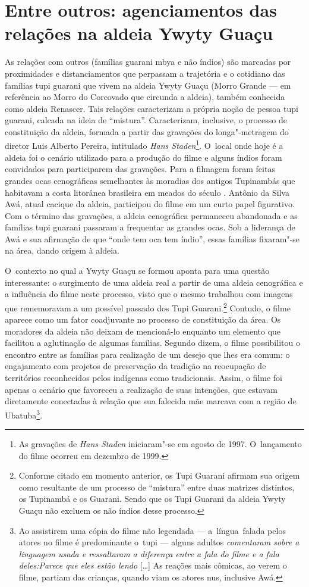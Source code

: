 \section{Entre outros: agenciamentos das relações na aldeia Ywyty Guaçu} 

As relações com outros (famílias guarani mbya e não índios) são marcadas
por proximidades e distanciamentos que perpassam a trajetória e o
cotidiano das famílias tupi guarani que vivem na aldeia Ywyty Guaçu
(Morro Grande --- em referência ao Morro do Corcovado que circunda a
aldeia), também conhecida como aldeia Renascer. Tais relações
caracterizam a própria noção de pessoa tupi guarani, calcada na ideia
de ``mistura''. Caracterizam, inclusive, o processo de constituição da
aldeia, formada a partir das gravações do longa"-metragem do diretor
Luis Alberto Pereira, intitulado \emph{Hans Staden}\footnote{As gravações de
\emph{Hans Staden} iniciaram"-se em agosto de 1997. O~lançamento do filme
ocorreu em dezembro de 1999.}. O~local onde hoje é a aldeia foi o
cenário utilizado para a produção do filme e alguns índios foram
convidados para participarem das gravações. Para a filmagem foram
feitas grandes ocas cenográficas semelhantes às moradias dos antigos
Tupinambás que habitavam a costa litorânea brasileira em meados do
século . Antônio da Silva Awá, atual cacique da aldeia, participou
do filme em um curto papel figurativo. Com o término das gravações, a
aldeia cenográfica permaneceu abandonada e as famílias tupi guarani
passaram a frequentar as grandes ocas. Sob a liderança de Awá e sua
afirmação de que ``onde tem oca tem índio'', essas famílias fixaram"-se na
área, dando origem à aldeia.

O~contexto no qual a Ywyty Guaçu se formou aponta para uma questão
interessante: o surgimento de uma aldeia real a partir de uma aldeia
cenográfica e a influência do filme neste processo, visto que o mesmo
trabalhou com imagens que rememoravam a um possível passado dos Tupi
Guarani.\footnote{Conforme citado em momento anterior, os Tupi Guarani
afirmam sua origem como resultante de um processo de ``mistura'' entre duas
matrizes distintos, os Tupinambá e os Guarani. Sendo que os Tupi
Guarani da aldeia Ywyty Guaçu não excluem os não índios desse
processo.} Contudo, o filme aparece como um fator coadjuvante no
processo de constituição da área. Os moradores da aldeia não deixam de
mencioná-lo enquanto um elemento que facilitou a aglutinação de algumas
famílias. Segundo dizem, o filme possibilitou o encontro entre as
famílias para realização de um desejo que lhes era comum: o engajamento
com projetos de preservação da tradição na reocupação de territórios
reconhecidos pelos indígenas como tradicionais. Assim, o filme foi
apenas o cenário que favoreceu a realização de suas intenções, que
estavam diretamente conectadas à relação que sua falecida mãe marcava
com a região de Ubatuba\footnote{Ao assistirem uma cópia do filme não
legendada --- a~língua~falada pelos atores no filme é predominante o~tupi
--- alguns adultos \emph{comentaram sobre a linguagem usada e ressaltaram
a diferença entre a fala do filme e a fala deles:}\emph{Parece que
eles estão lendo} [\ldots{}] As reações mais cômicas, ao verem o filme, partiam
das crianças, quando viam os atores nus, inclusive Awá.}.

